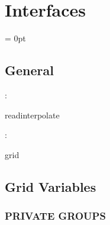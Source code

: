 
\section{Interfaces} 


\parskip = 0pt

\vspace{3mm} \subsection*{General}

: 

readinterpolate
\vspace{2mm}

: 

grid
\vspace{2mm}
\subsection*{Grid Variables}
\vspace{5mm}\subsubsection{PRIVATE GROUPS}

\vspace{5mm}

